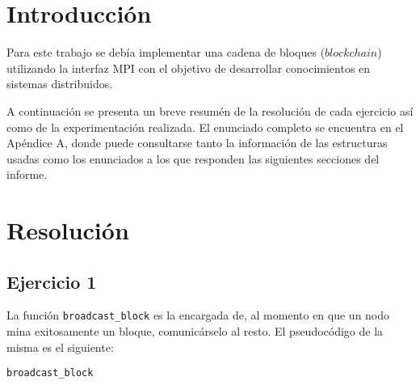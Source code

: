 \documentclass[10pt, a4paper, hidelinks]{article}
\begin{document}

\maketitle

\tableofcontents
{}

\pagebreak
{}
\cfoot{\thepage /\pageref{LastPage}}

\section{Introducción}
Para este trabajo se debía implementar una cadena de bloques ($blockchain$) utilizando la interfaz MPI con el objetivo de desarrollar conocimientos en sistemas distribuidos.

A continuación se presenta un breve resumén de la resolución de cada ejercicio así como de la experimentación realizada. El enunciado completo se encuentra en el Apéndice A, donde puede consultarse tanto la información de las estructuras usadas como los enunciados a los que responden las siguientes secciones del informe.

\section{Resolución}
\subsection{Ejercicio 1}
La función \texttt{broadcast\_block} es la encargada de, al momento en que un nodo mina exitosamente un bloque, comunicárselo al resto. El pseudocódigo de la misma es el siguiente:

\begin{algorithm}[H]
\SetAlgoLined
{}
\caption{\texttt{broadcast\_block}}
\end{algorithm}
\end{document}
